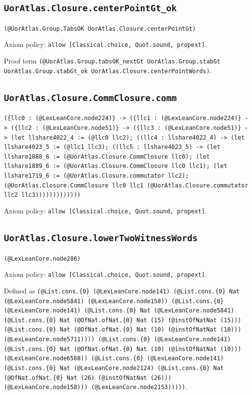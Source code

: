 \documentclass[11pt]{article}
\begin{document}
\subsection*{\texttt{UorAtlas.Closure.centerPointGt\_ok}}
\noindent\texttt{(@UorAtlas.Group.TabsOK UorAtlas.Closure.centerPointGt)}\par
\noindent Axiom policy: \texttt{allow [Classical.choice, Quot.sound, propext]}.\par
\noindent Proof term \texttt{(@UorAtlas.Group.tabsOK\_nextGt UorAtlas.Group.stabGt UorAtlas.Group.stabGt\_ok UorAtlas.Closure.centerPointWords)}.\par
\subsection*{\texttt{UorAtlas.Closure.CommClosure.comm}}
\noindent\texttt{(\{llc0 : (@LexLeanCore.node224)\} -> (\{llc1 : (@LexLeanCore.node224)\} -> (\{llc2 : (@LexLeanCore.node51)\} -> (\{llc3 : (@LexLeanCore.node51)\} -> (let llshare4022\_4 := (@llc0 llc2); ((llc4 : llshare4022\_4) -> (let llshare4023\_5 := (@llc1 llc3); ((llc5 : llshare4023\_5) -> (let llshare1888\_6 := (@UorAtlas.Closure.CommClosure llc0); (let llshare1889\_6 := (@UorAtlas.Closure.CommClosure llc0 llc1); (let llshare1719\_6 := (@UorAtlas.Closure.commutator llc2); (@UorAtlas.Closure.CommClosure llc0 llc1 (@UorAtlas.Closure.commutator llc2 llc3)))))))))))))}\par
\noindent Axiom policy: \texttt{allow [Classical.choice, Quot.sound, propext]}.\par
\subsection*{\texttt{UorAtlas.Closure.lowerTwoWitnessWords}}
\noindent\texttt{(@LexLeanCore.node286)}\par
\noindent Axiom policy: \texttt{allow [Classical.choice, Quot.sound, propext]}.\par
\noindent Defined as \texttt{(@List.cons.\{0\} (@LexLeanCore.node141) (@List.cons.\{0\} Nat (@LexLeanCore.node5841) (@LexLeanCore.node158)) (@List.cons.\{0\} (@LexLeanCore.node141) (@List.cons.\{0\} Nat (@LexLeanCore.node5841) (@List.cons.\{0\} Nat (@OfNat.ofNat.\{0\} Nat (15) (@instOfNatNat (15))) (@List.cons.\{0\} Nat (@OfNat.ofNat.\{0\} Nat (10) (@instOfNatNat (10))) (@LexLeanCore.node5711)))) (@List.cons.\{0\} (@LexLeanCore.node141) (@List.cons.\{0\} Nat (@OfNat.ofNat.\{0\} Nat (10) (@instOfNatNat (10))) (@LexLeanCore.node6568)) (@List.cons.\{0\} (@LexLeanCore.node141) (@List.cons.\{0\} Nat (@LexLeanCore.node2124) (@List.cons.\{0\} Nat (@OfNat.ofNat.\{0\} Nat (26) (@instOfNatNat (26))) (@LexLeanCore.node158))) (@LexLeanCore.node2153)))))}.\par
\end{document}
